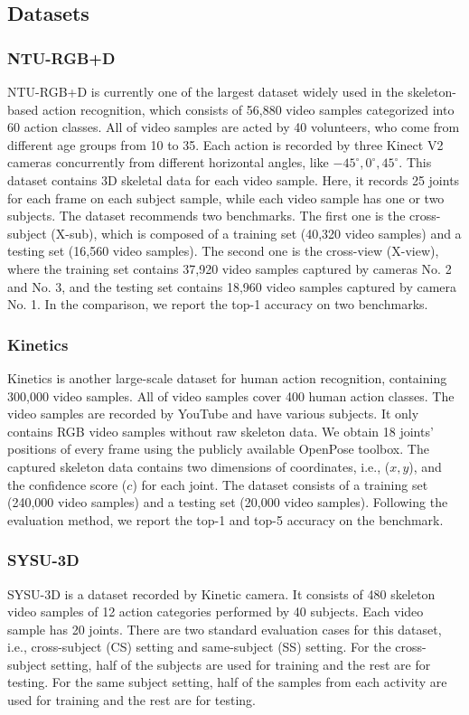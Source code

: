 \documentclass[journal]{IEEEtran}
\begin{document}
\subsection{Datasets}
\subsubsection{NTU-RGB+D} NTU-RGB+D is currently one of the largest dataset widely used in the skeleton-based action recognition, which consists of 56,880 video samples categorized into 60 action classes. All of video samples are acted by 40 volunteers, who come from different age groups from 10 to 35. Each action is recorded by three Kinect V2 cameras concurrently from different horizontal angles, like $-45^{\circ},0^{\circ},45^{\circ}$. This dataset contains 3D skeletal data for each video sample. Here, it records 25 joints for each frame on each subject sample, while each video sample has one or two subjects. The dataset recommends two benchmarks. The first one is the cross-subject (X-sub), which is composed of a training set (40,320 video samples) and a testing set (16,560 video samples). The second one is the cross-view (X-view), where the training set contains 37,920 video samples captured by cameras No. 2 and No. 3, and the testing set contains 18,960 video samples captured by camera No. 1. In the comparison, we report the top-1 accuracy on two benchmarks.

\subsubsection{Kinetics} Kinetics is another large-scale dataset for human action recognition, containing 300,000 video samples. All of video samples cover 400 human action classes. The video samples are recorded by YouTube and have various subjects. It only contains RGB video samples without raw skeleton data. We obtain 18 joints' positions of every frame using the publicly available OpenPose toolbox. The captured skeleton data contains two dimensions of coordinates, i.e., ($x,y$), and the confidence score ($c$) for each joint. The dataset consists of a training set (240,000 video samples) and a testing set (20,000 video samples). Following the evaluation method, we report the top-1 and top-5 accuracy on the benchmark.

\subsubsection{SYSU-3D} SYSU-3D is a dataset recorded by Kinetic camera. It consists of 480 skeleton video samples of 12 action categories performed by 40 subjects. Each video sample has 20 joints. There are two standard evaluation cases for this dataset, i.e., cross-subject (CS) setting and same-subject (SS) setting. For the cross-subject setting, half of the subjects are used for training and the rest are for testing. For the same subject setting, half of the samples from each activity are used for training and the rest are for testing.
\end{document}
